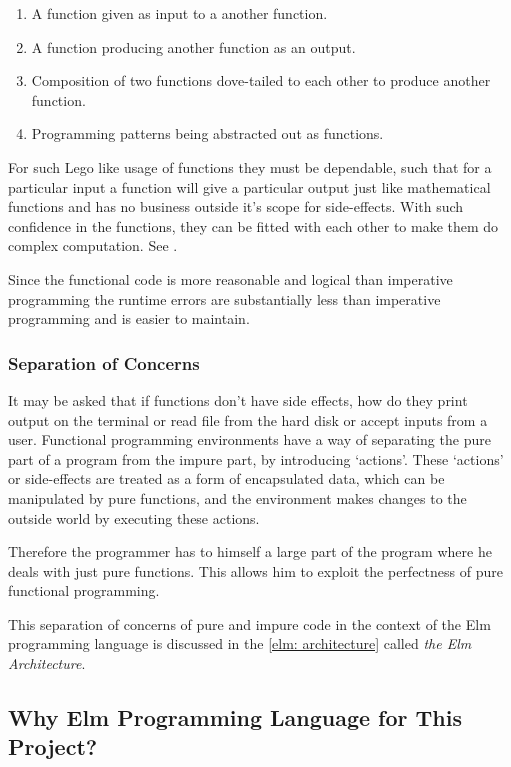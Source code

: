 \begin{enumerate}
\item A function given as input to a another function. 
\item A function producing another function as an output.
\item Composition of two functions dove-tailed to each other to produce another function.
\item Programming patterns being abstracted out as functions.
\end{enumerate}

For such Lego like usage of functions they must be dependable, such that for a
particular input a function will give a particular output just like
mathematical functions and has no business outside it's scope for side-effects.
With such confidence in the functions, they can be fitted with each other to
make them do complex computation. See \cite{Hughes89}.

Since the functional code is more reasonable and logical than imperative
programming the runtime errors are substantially less than imperative
programming and is easier to maintain.


\subsubsection{Separation of Concerns}
It may be asked that if functions don't have side effects, how do they print
output on the terminal or read file from the hard disk or accept inputs from a
user. Functional programming environments have a way of separating the pure
part of a program from the impure part, by introducing `actions'. These
`actions' or side-effects are treated as a form of encapsulated data, which
can be manipulated by pure functions, and the environment makes changes to the
outside world by executing these actions.

Therefore the programmer has to himself a large part of the program where he
deals with just pure functions. This allows him to exploit the perfectness of
pure functional programming.

This separation of concerns of pure and impure code in the context of the Elm
programming language is discussed in the \autoref{elm: architecture} called
\emph{the Elm Architecture}.

\subsection{Why Elm Programming Language for This Project?}

